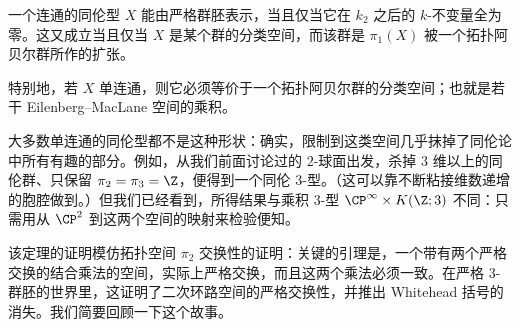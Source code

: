\begin{proposition}
一个连通的同伦型 $X$ 能由严格群胚表示，当且仅当它在 $k_2$ 之后的 $k$-不变量全为零。这又成立当且仅当 $X$ 是某个群的分类空间，而该群是 $\pi_1(X)$ 被一个拓扑阿贝尔群所作的扩张。

特别地，若 $X$ 单连通，则它必须等价于一个拓扑阿贝尔群的分类空间；也就是若干 Eilenberg--MacLane 空间的乘积。
\end{proposition}

大多数单连通的同伦型都不是这种形状：确实，限制到这类空间几乎抹掉了同伦论中所有有趣的部分。例如，从我们前面讨论过的 $2$-球面出发，杀掉 $3$ 维以上的同伦群、只保留 $\pi_2=\pi_3=\Z$，便得到一个同伦 $3$-型。（这可以靠不断粘接维数递增的胞腔做到。）但我们已经看到，所得结果与乘积 $3$-型 $\CP^\infty\times K(\Z;3)$ 不同：只需用从 $\CP^2$ 到这两个空间的映射来检验便知。

该定理的证明模仿拓扑空间 $\pi_2$ 交换性的证明：关键的引理是，一个带有两个严格交换的结合乘法的空间，实际上严格交换，而且这两个乘法必须一致。在严格 $3$-群胚的世界里，这证明了二次环路空间的严格交换性，并推出 Whitehead 括号的消失。我们简要回顾一下这个故事。
